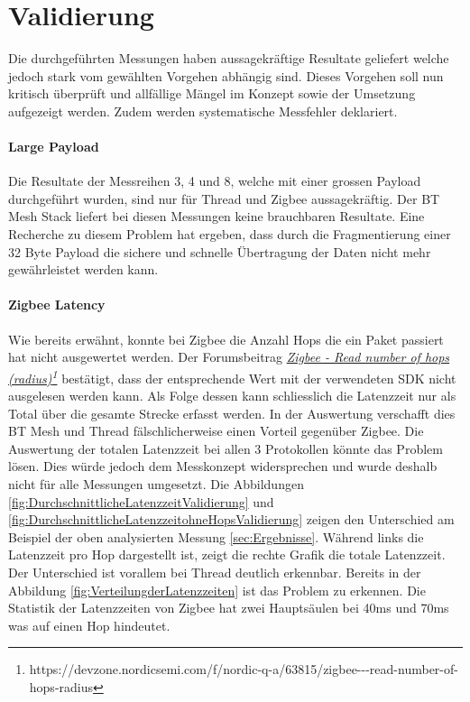 \clearpage
\section{Validierung}\label{sec:Validierung}
Die durchgeführten Messungen haben aussagekräftige Resultate geliefert welche jedoch stark vom gewählten Vorgehen abhängig sind. Dieses Vorgehen soll nun kritisch überprüft und allfällige Mängel im Konzept sowie der Umsetzung aufgezeigt werden. Zudem werden systematische Messfehler deklariert.

\paragraph{Large Payload}
Die Resultate der Messreihen 3, 4 und 8, welche mit einer grossen Payload durchgeführt wurden, sind nur für Thread und Zigbee aussagekräftig. Der BT Mesh Stack liefert bei diesen Messungen keine brauchbaren Resultate. Eine Recherche zu diesem Problem hat ergeben, dass durch die Fragmentierung einer 32 Byte Payload die sichere und schnelle Übertragung der Daten nicht mehr gewährleistet werden kann.

\paragraph{Zigbee Latency}
Wie bereits erwähnt, konnte bei Zigbee die Anzahl Hops die ein Paket passiert hat nicht ausgewertet werden.
Der Forumsbeitrag \href{https://devzone.nordicsemi.com/f/nordic-q-a/63815/zigbee---read-number-of-hops-radius}{\textit{Zigbee - Read number of hops (radius)\footnote{\url{https://devzone.nordicsemi.com/f/nordic-q-a/63815/zigbee---read-number-of-hops-radius}}}} bestätigt, dass der entsprechende Wert mit der verwendeten SDK nicht ausgelesen werden kann.
Als Folge dessen kann schliesslich die Latenzzeit nur als Total über die gesamte Strecke erfasst werden. In der Auswertung verschafft dies BT Mesh und Thread fälschlicherweise einen Vorteil gegenüber Zigbee.
Die Auswertung der totalen Latenzzeit bei allen 3 Protokollen könnte das Problem lösen.
Dies würde jedoch dem Messkonzept widersprechen und wurde deshalb nicht für alle Messungen umgesetzt.
Die Abbildungen \ref{fig:DurchschnittlicheLatenzzeitValidierung} und \ref{fig:DurchschnittlicheLatenzzeitohneHopsValidierung} zeigen den Unterschied am Beispiel der oben analysierten Messung \ref{sec:Ergebnisse}.
Während links die Latenzzeit pro Hop dargestellt ist, zeigt die rechte Grafik die totale Latenzzeit.
Der Unterschied ist vorallem bei Thread deutlich erkennbar.
Bereits in der Abbildung \ref{fig:VerteilungderLatenzzeiten} ist das Problem zu erkennen.
Die Statistik der Latenzzeiten von Zigbee hat zwei Hauptsäulen bei 40ms und 70ms was auf einen Hop hindeutet.


